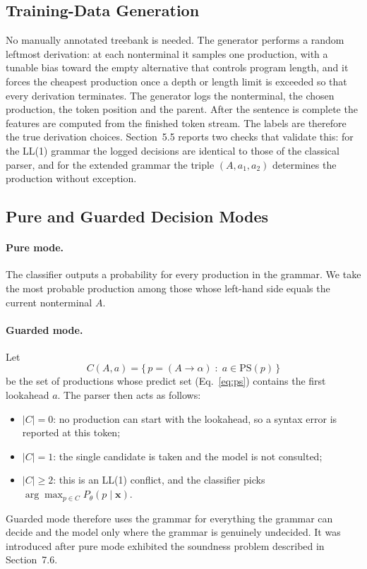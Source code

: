 \documentclass[12pt,a4paper]{article}
\begin{document}
\subsection{Training-Data Generation}

No manually annotated treebank is needed. The generator performs a random
leftmost derivation: at each nonterminal it samples one production, with a
tunable bias toward the empty alternative that controls program length, and it
forces the cheapest production once a depth or length limit is exceeded so that
every derivation terminates. The generator logs the nonterminal, the chosen
production, the token position and the parent. After the sentence is complete
the features are computed from the finished token stream. The labels are
therefore the true derivation choices. Section~5.5 reports two checks
that validate this: for the LL(1) grammar the logged decisions are identical to
those of the classical parser, and for the extended grammar the triple
$(A,a_1,a_2)$ determines the production without exception.

\subsection{Pure and Guarded Decision Modes}

\paragraph{Pure mode.} The classifier outputs a probability for every
production in the grammar. We take the most probable production among those
whose left-hand side equals the current nonterminal $A$.

\paragraph{Guarded mode.} Let
\begin{equation}
C(A,a)=\{\,p=(A\rightarrow\alpha)\;:\;a\in\mathrm{PS}(p)\,\}
\end{equation}
be the set of productions whose predict set (Eq.~\ref{eq:ps}) contains the first
lookahead $a$. The parser then acts as follows:
\begin{itemize}
    \item $|C|=0$: no production can start with the lookahead, so a syntax error is reported at this token;
    \item $|C|=1$: the single candidate is taken and the model is not consulted;
    \item $|C|\ge 2$: this is an LL(1) conflict, and the classifier picks
    $\arg\max_{p\in C}P_\theta(p\mid\mathbf{x})$.
\end{itemize}
Guarded mode therefore uses the grammar for everything the grammar can decide
and the model only where the grammar is genuinely undecided. It was introduced
after pure mode exhibited the soundness problem described in
Section~7.6.
\end{document}
